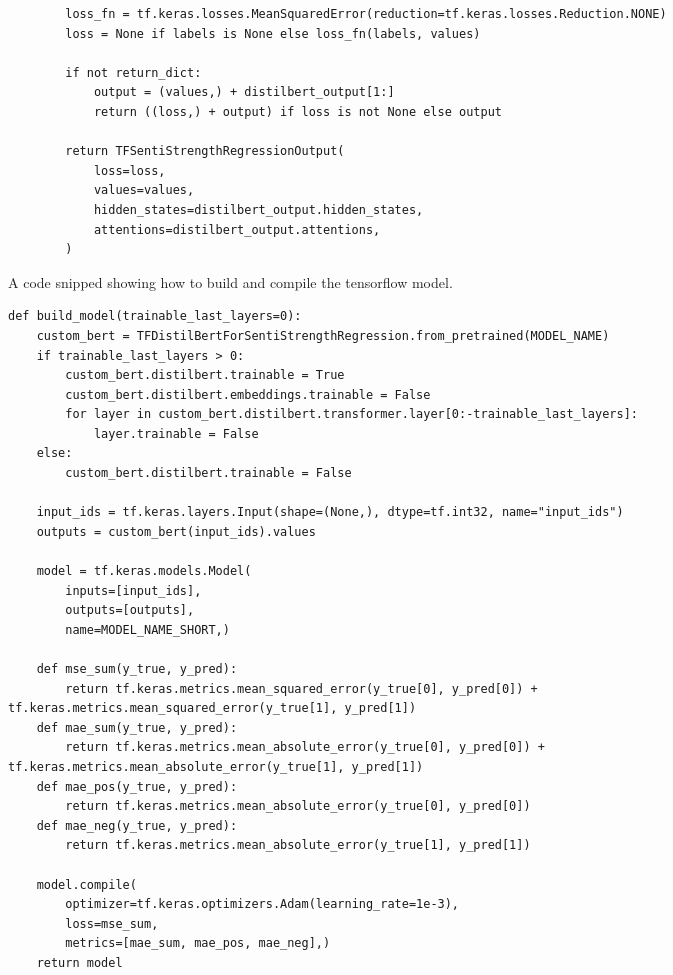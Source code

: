\begin{listing*}
\begin{verbatim}
        loss_fn = tf.keras.losses.MeanSquaredError(reduction=tf.keras.losses.Reduction.NONE)
        loss = None if labels is None else loss_fn(labels, values)

        if not return_dict:
            output = (values,) + distilbert_output[1:]
            return ((loss,) + output) if loss is not None else output

        return TFSentiStrengthRegressionOutput(
            loss=loss,
            values=values,
            hidden_states=distilbert_output.hidden_states,
            attentions=distilbert_output.attentions,
        )
\end{verbatim}
\label{listing:p2t-regression-model}
\end{listing*}

\begin{listing*}
\caption{A code snipped showing how to build and compile the tensorflow model.}
\begin{verbatim}
def build_model(trainable_last_layers=0):
    custom_bert = TFDistilBertForSentiStrengthRegression.from_pretrained(MODEL_NAME)
    if trainable_last_layers > 0:
        custom_bert.distilbert.trainable = True
        custom_bert.distilbert.embeddings.trainable = False
        for layer in custom_bert.distilbert.transformer.layer[0:-trainable_last_layers]:
            layer.trainable = False
    else:
        custom_bert.distilbert.trainable = False

    input_ids = tf.keras.layers.Input(shape=(None,), dtype=tf.int32, name="input_ids")
    outputs = custom_bert(input_ids).values

    model = tf.keras.models.Model(
        inputs=[input_ids],
        outputs=[outputs],
        name=MODEL_NAME_SHORT,)

    def mse_sum(y_true, y_pred):
        return tf.keras.metrics.mean_squared_error(y_true[0], y_pred[0]) + tf.keras.metrics.mean_squared_error(y_true[1], y_pred[1])
    def mae_sum(y_true, y_pred):
        return tf.keras.metrics.mean_absolute_error(y_true[0], y_pred[0]) + tf.keras.metrics.mean_absolute_error(y_true[1], y_pred[1])
    def mae_pos(y_true, y_pred):
        return tf.keras.metrics.mean_absolute_error(y_true[0], y_pred[0])
    def mae_neg(y_true, y_pred):
        return tf.keras.metrics.mean_absolute_error(y_true[1], y_pred[1])

    model.compile(
        optimizer=tf.keras.optimizers.Adam(learning_rate=1e-3),
        loss=mse_sum,
        metrics=[mae_sum, mae_pos, mae_neg],)
    return model
\end{verbatim}
\label{listing:p2t-build-model}
\end{listing*}

